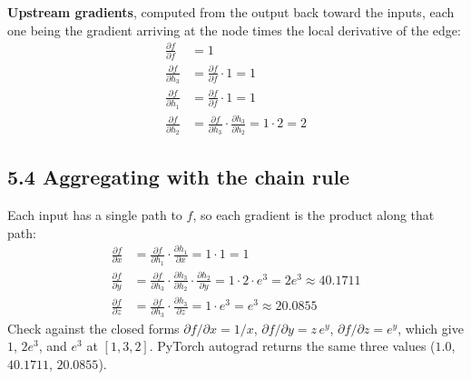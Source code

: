 \documentclass[11pt]{article}
\begin{document}
\textbf{Upstream gradients}, computed from the output back toward the inputs, each one being the gradient arriving at the node times the local derivative of the edge:
\begin{align*}
\frac{\partial f}{\partial f} &= 1\\
\frac{\partial f}{\partial h_3} &= \frac{\partial f}{\partial f}\cdot 1 = 1\\
\frac{\partial f}{\partial h_1} &= \frac{\partial f}{\partial f}\cdot 1 = 1\\
\frac{\partial f}{\partial h_2} &= \frac{\partial f}{\partial h_3}\cdot\frac{\partial h_3}{\partial h_2} = 1\cdot 2 = 2
\end{align*}

\subsection*{5.4 Aggregating with the chain rule}
Each input has a single path to $f$, so each gradient is the product along that path:
\begin{align*}
\frac{\partial f}{\partial x} &= \frac{\partial f}{\partial h_1}\cdot\frac{\partial h_1}{\partial x} = 1\cdot 1 = 1\\
\frac{\partial f}{\partial y} &= \frac{\partial f}{\partial h_3}\cdot\frac{\partial h_3}{\partial h_2}\cdot\frac{\partial h_2}{\partial y} = 1\cdot 2\cdot e^{3} = 2e^{3}\approx 40.1711\\
\frac{\partial f}{\partial z} &= \frac{\partial f}{\partial h_3}\cdot\frac{\partial h_3}{\partial z} = 1\cdot e^{3} = e^{3}\approx 20.0855
\end{align*}
Check against the closed forms $\partial f/\partial x = 1/x$, $\partial f/\partial y = z\,e^{y}$, $\partial f/\partial z = e^{y}$, which give $1$, $2e^{3}$, and $e^{3}$ at $[1,3,2]$. PyTorch autograd returns the same three values ($1.0$, $40.1711$, $20.0855$).


\end{document}
